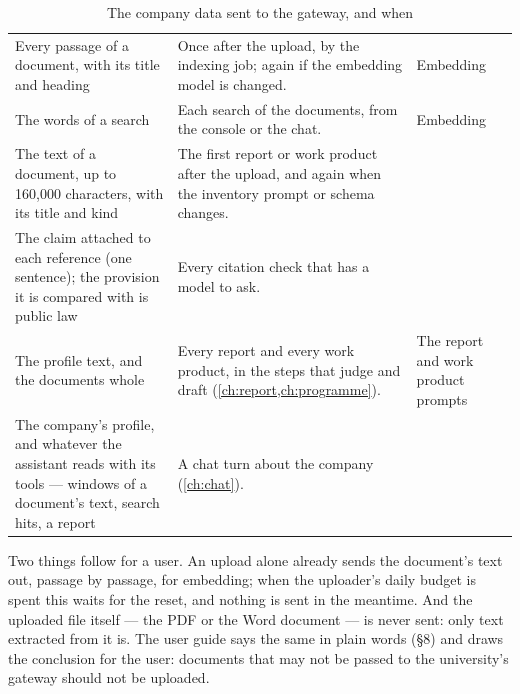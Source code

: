 \begin{table}[H]
\caption{The company data sent to the gateway, and when}\label{tab:company:leaves}
\begin{tabularx}{\textwidth}{@{}L{43mm}YL{40mm}@{}}
\toprule
{} &  &  \\
\midrule
Every passage of a document, with its title and heading &
  Once after the upload, by the indexing job; again if the embedding model is changed. &
  Embedding \\
The words of a search &
  Each search of the documents, from the console or the chat. &
  Embedding \\
The text of a document, up to 160,000 characters, with its title and kind &
  The first report or work product after the upload, and again when the inventory prompt or
  schema changes. &
   \\
The claim attached to each reference (one sentence); the provision it is compared with is
  public law &
  Every citation check that has a model to ask. &
   \\
The profile text, and the documents whole &
  Every report and every work product, in the steps that judge and draft
  (\cref{ch:report,ch:programme}). &
  The report and work product prompts \\
The company's profile, and whatever the assistant reads with its tools --- windows of a
  document's text, search hits, a report &
  A chat turn about the company (\cref{ch:chat}). &
   \\
\bottomrule
\end{tabularx}
\end{table}

Two things follow for a user. An upload alone already sends the document's text out, passage
by passage, for embedding; when the uploader's daily budget is spent this waits for the reset,
and nothing is sent in the meantime. And the uploaded file itself --- the PDF or the Word
document --- is never sent: only text extracted from it is. The user guide says the same in
plain words (§8) and draws the conclusion for the user: documents that may not be passed to the
university's gateway should not be uploaded.
